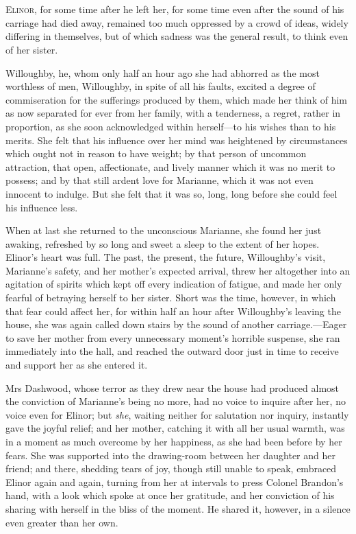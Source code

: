 \chapter[Chapter \thechapter]{}
\lettrine[lines=4,lraise=0.3]{E}{linor}, for some time after he left her, for some time even after the sound of his carriage had died away, remained too much oppressed by a crowd of ideas, widely differing in themselves, but of which sadness was the general result, to think even of her sister.

Willoughby, he, whom only half an hour ago she had abhorred as the most worthless of men, Willoughby, in spite of all his faults, excited a degree of commiseration for the sufferings produced by them, which made her think of him as now separated for ever from her family, with a tenderness, a regret, rather in proportion, as she soon acknowledged within herself—to his wishes than to his merits. She felt that his influence over her mind was heightened by circumstances which ought not in reason to have weight; by that person of uncommon attraction, that open, affectionate, and lively manner which it was no merit to possess; and by that still ardent love for Marianne, which it was not even innocent to indulge. But she felt that it was so, long, long before she could feel his influence less.

When at last she returned to the unconscious Marianne, she found her just awaking, refreshed by so long and sweet a sleep to the extent of her hopes. Elinor’s heart was full. The past, the present, the future, Willoughby’s visit, Marianne’s safety, and her mother’s expected arrival, threw her altogether into an agitation of spirits which kept off every indication of fatigue, and made her only fearful of betraying herself to her sister. Short was the time, however, in which that fear could affect her, for within half an hour after Willoughby’s leaving the house, she was again called down stairs by the sound of another carriage.—Eager to save her mother from every unnecessary moment’s horrible suspense, she ran immediately into the hall, and reached the outward door just in time to receive and support her as she entered it.

Mrs Dashwood, whose terror as they drew near the house had produced almost the conviction of Marianne’s being no more, had no voice to inquire after her, no voice even for Elinor; but \textit{she}, waiting neither for salutation nor inquiry, instantly gave the joyful relief; and her mother, catching it with all her usual warmth, was in a moment as much overcome by her happiness, as she had been before by her fears. She was supported into the drawing-room between her daughter and her friend; and there, shedding tears of joy, though still unable to speak, embraced Elinor again and again, turning from her at intervals to press Colonel Brandon’s hand, with a look which spoke at once her gratitude, and her conviction of his sharing with herself in the bliss of the moment. He shared it, however, in a silence even greater than her own.


